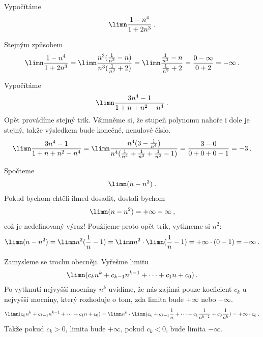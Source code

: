 \begin{example}
    Vypočítáme
    \begin{align}
        \limn \frac{1-n^4}{1+2n^3} \:.
    \end{align}

    Stejným způsobem
    \begin{align}
        \limn \frac{1-n^4}{1+2n^3} = \limn \frac{n^3(\frac{1}{n^3}-n)}{n^3(\frac{1}{n^3}+2)}
        =
        \limn \frac{\frac{1}{n^3}-n}{\frac{1}{n^3}+2}
        =
        \frac{0-\infty}{0 + 2} = - \infty \:.
    \end{align}
\end{example}

\begin{example}
    Vypočítáme
    \begin{align}
        \limn \frac{3n^4-1}{1+n+n^2-n^4} \:.
    \end{align}
    Opět provádíme stejný trik. Všimněme si, že stupeň polynomu nahoře i dole je stejný, takže výsledkem bude konečné, nenulové číslo.
    \begin{align}
        \limn \frac{3n^4-1}{1+n+n^2-n^4} =
        \limn \frac{n^4(3-\frac{1}{n^4})}{n^4(\frac{1}{n^4}+\frac{1}{n^3}+\frac{1}{n^2}-1)}
        =
        \frac{3-0}{0+0+0-1} = -3 \:.
    \end{align}
\end{example}

\begin{example}
    Spočteme
    \begin{align}
        \limn (n-n^2) \:.
    \end{align}
    Pokud bychom chtěli ihned dosadit, dostali bychom
    \begin{align}
        \limn (n-n^2) = + \infty - \infty \:,
    \end{align}
    což je nedefinovaný výraz!
    Použijeme proto opět trik, vytkneme si $n^2$:
    \begin{align}
        \limn (n-n^2) = \limn n^2 ( \frac{1}{n} - 1) = \limn n^2 \cdot \limn (\frac{1}{n}-1) = + \infty \cdot (0-1) = - \infty \:.
    \end{align}
\end{example}

\begin{example}
    Zamysleme se trochu obecněji. Vyřešme limitu 
    \begin{align}
        \limn (c_k n^k + c_{k-1} n^{k-1} + \cdots + c_1 n + c_0) \:.
    \end{align}
    Po vytknutí nejvyšší mocniny $n^k$ uvidíme, že nás zajímá pouze koeficient $c_k$ u nejvyšší mocniny, který rozhoduje o tom, zda limita bude $+\infty$ nebo $-\infty$.
    \begin{align}
        \limn (c_k n^k + c_{k-1} n^{k-1} + \cdots + c_1 n + c_0) = \limn n^k \cdot \limn (c_k + c_{k-1} \frac{1}{n} + \cdots + c_1 \frac{1}{n^{k-1}} + c_0 \frac{1}{n^k}) = +\infty \cdot c_k \:. 
    \end{align}
    Takže pokud $c_k >0$, limita bude $+\infty$, pokud $c_k<0$, bude limita $-\infty$.
\end{example}

